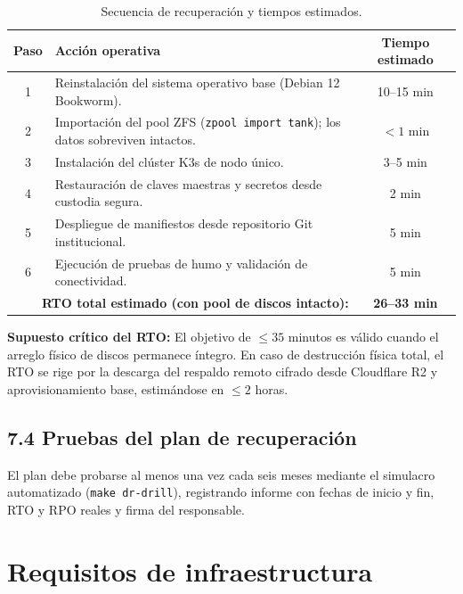 \documentclass[10pt,a4paper]{article}
\begin{document}
\begin{table}[htbp]
\centering
\small
\caption{Secuencia de recuperación y tiempos estimados.}
\label{tab:recuperacion}
\begin{tabular}{|c|p{10cm}|c|}
\hline
\textbf{\textsf{Paso}} & \textbf{\textsf{Acción operativa}} & \textbf{\textsf{Tiempo estimado}} \\
\hline
1 & Reinstalación del sistema operativo base (Debian 12 Bookworm). & 10–15 min \\
\hline
2 & Importación del pool ZFS (\texttt{zpool import tank}); los datos sobreviven intactos. & $< 1\text{ min}$ \\
\hline
3 & Instalación del clúster K3s de nodo único. & 3–5 min \\
\hline
4 & Restauración de claves maestras y secretos desde custodia segura. & 2 min \\
\hline
5 & Despliegue de manifiestos desde repositorio Git institucional. & 5 min \\
\hline
6 & Ejecución de pruebas de humo y validación de conectividad. & 5 min \\
\hline
\multicolumn{2}{|r|}{\textbf{RTO total estimado (con pool de discos intacto):}} & \textbf{26–33 min} \\
\hline
\end{tabular}
\end{table}

\begin{normativabox}{}
\textbf{Supuesto crítico del RTO:} El objetivo de $\le 35$ minutos es válido cuando el arreglo físico de discos permanece íntegro. En caso de destrucción física total, el RTO se rige por la descarga del respaldo remoto cifrado desde Cloudflare R2 y aprovisionamiento base, estimándose en $\le 2$ horas.
\end{normativabox}

\subsection{7.4 Pruebas del plan de recuperación}
El plan debe probarse al menos una vez cada seis meses mediante el simulacro automatizado (\texttt{make dr-drill}), registrando informe con fechas de inicio y fin, RTO y RPO reales y firma del responsable.

\newpage
\section{Requisitos de infraestructura}
\end{document}
